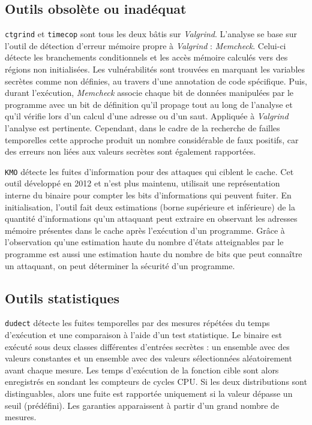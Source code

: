 \subsection*{Outils obsolète ou inadéquat}

\texttt{ctgrind} et \texttt{timecop} sont tous les deux bâtis sur \textit{Valgrind}. L'analyse se base sur l'outil de détection d'erreur mémoire propre à \textit{Valgrind} : \textit{Memcheck}. Celui-ci détecte les branchements conditionnels et les accès mémoire calculés vers des régions non initialisées. Les vulnérabilités sont trouvées en marquant les variables secrètes comme non définies, au travers d'une annotation de code spécifique. Puis, durant l'exécution, \textit{Memcheck} associe chaque bit de données manipulées par le programme avec un bit de définition qu'il propage tout au long de l'analyse et qu'il vérifie lors d'un calcul d'une adresse ou d'un saut. Appliquée à \textit{Valgrind} l'analyse est pertinente. Cependant, dans le cadre de la recherche de failles temporelles cette approche produit un nombre considérable de faux positifs, car des erreurs non liées aux valeurs secrètes sont également rapportées.\medbreak


\texttt{KMO} détecte les fuites d'information pour des attaques qui ciblent le cache. Cet outil développé en 2012 et n'est plus maintenu, utilisait une représentation interne du binaire pour compter les bits d'informations qui peuvent fuiter. En initialisation, l'outil fait deux estimations (borne supérieure et inférieure) de la quantité d'informations qu'un attaquant peut extraire en observant les adresses mémoire présentes dans le cache après l'exécution d'un programme. Grâce à l'observation qu'une estimation haute du nombre d'états atteignables par le programme est aussi une estimation haute du nombre de bits que peut connaître un attaquant, on peut déterminer la sécurité d'un programme.


\subsection*{Outils statistiques}

\texttt{dudect} détecte les fuites temporelles par des mesures répétées du temps d'exécution et une comparaison à l'aide d'un test statistique. Le binaire est exécuté sous deux classes différentes d'entrées secrètes : un ensemble avec des valeurs constantes et un ensemble avec des valeurs sélectionnées aléatoirement avant chaque mesure. Les temps d'exécution de la fonction cible sont alors enregistrés en sondant les compteurs de cycles CPU. Si les deux distributions sont distinguables, alors une fuite est rapportée uniquement si la valeur dépasse un seuil (prédéfini). Les garanties apparaissent à partir d'un grand nombre de mesures.\medbreak

